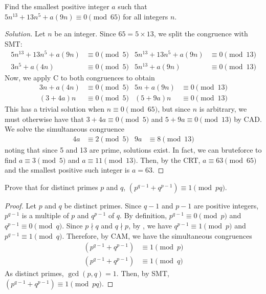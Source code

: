 \documentclass{agony}
\begin{document}
\question Find the smallest positive integer $a$ such that
$5n^{13}+13n^5+a(9n) \equiv 0 \pmod{65}$ for all integers $n$.
\begin{proof}[Solution]
  Let $n$ be an integer.
  Since $65 = 5 \times 13$, we split the congruence with SMT:
  \begin{align*}
    5n^{13}+13n^5+a(9n) & \equiv 0 \pmod{5} & 5n^{13}+13n^5+a(9n) & \equiv 0 \pmod{13} \\
    3n^5+a(4n)          & \equiv 0 \pmod{5} & 5n^{13}+a(9n)       & \equiv 0 \pmod{13}
  \end{align*}
  Now, we apply C\FLT{} to both congruences to obtain
  \begin{align*}
    3n+a(4n) & \equiv 0 \pmod{5} & 5n+a(9n) & \equiv 0 \pmod{13} \\
    (3+4a)n  & \equiv 0 \pmod{5} & (5+9a)n  & \equiv 0 \pmod{13}
  \end{align*}
  This has a trivial solution when $n \equiv 0 \pmod{65}$, but since $n$ is arbitrary,
  we must otherwise have that $3+4a \equiv 0 \pmod 5$ and $5+9a \equiv 0 \pmod{13}$ by CAD\@.
  We solve the simultaneous congruence
  \begin{align*}
    4a & \equiv 2 \pmod{5} & 9a & \equiv 8 \pmod{13}
  \end{align*}
  noting that since 5 and 13 are prime, solutions exist.
  In fact, we can bruteforce to find $a \equiv 3 \pmod 5$ and $a \equiv 11 \pmod{13}$.
  Then, by the CRT, $a \equiv 63 \pmod{65}$ and the smallest positive such integer is $a = 63$.
\end{proof}


\question Prove that for distinct primes $p$ and $q$,
$\left(p^{q-1} + q^{p-1}\right) \equiv 1 \pmod{pq}$.
\begin{proof}
  Let $p$ and $q$ be distinct primes.
  Since $q-1$ and $p-1$ are positive integers, $p^{q-1}$ is a multiple of $p$ and $q^{p-1}$ of $q$.
  By definition, $p^{q-1} \equiv 0 \pmod p$ and $q^{p-1} \equiv 0 \pmod q$.
  Since $p \nmid q$ and $q \nmid p$, by \FLT, we have
  $q^{p-1} \equiv 1 \pmod p$ and $p^{q-1} \equiv 1 \pmod q$.
  Therefore, by CAM, we have the simultaneous congruences
  \begin{align*}
    \left( p^{q-1} + q^{p-1} \right) & \equiv 1 \pmod p \\
    \left( p^{q-1} + q^{p-1} \right) & \equiv 1 \pmod q
  \end{align*}
  As distinct primes, $\gcd(p,q)=1$.
  Then, by SMT, $\left(p^{q-1} + q^{p-1}\right) \equiv 1 \pmod{pq}$.
\end{proof}
\end{document}
